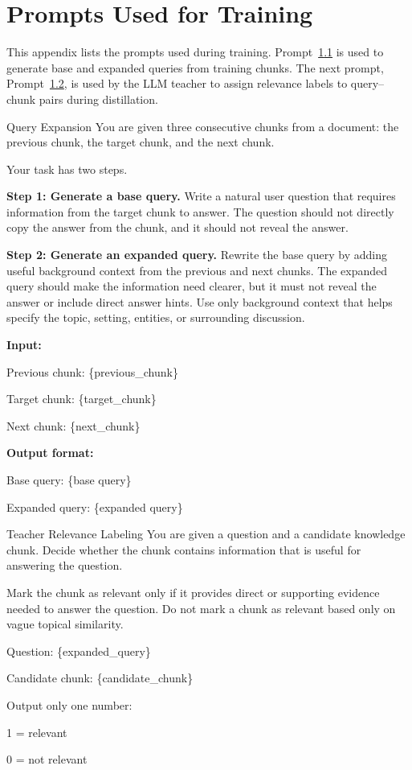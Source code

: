 \section{Prompts Used for Training}
\label{app:training_prompts}

This appendix lists the prompts used during training.  
Prompt~\hyperref[app:training_prompts]{\ref*{app:training_prompts}.1} is used to generate base and expanded queries from training chunks. 
The next prompt, Prompt~\hyperref[app:training_prompts]{\ref*{app:training_prompts}.2}, is used by the LLM teacher to assign relevance labels to query--chunk pairs during distillation.

\begin{promptbox}{Query Expansion}
\label{box:query_generation_prompt}
You are given three consecutive chunks from a document: the previous chunk, the target chunk, and the next chunk.

Your task has two steps.

\textbf{Step 1: Generate a base query.}  
Write a natural user question that requires information from the target chunk to answer. The question should not directly copy the answer from the chunk, and it should not reveal the answer.

\textbf{Step 2: Generate an expanded query.}  
Rewrite the base query by adding useful background context from the previous and next chunks. The expanded query should make the information need clearer, but it must not reveal the answer or include direct answer hints. Use only background context that helps specify the topic, setting, entities, or surrounding discussion.

\textbf{Input:}

Previous chunk: \{previous\_chunk\}

Target chunk: \{target\_chunk\}

Next chunk: \{next\_chunk\}

\textbf{Output format:}

Base query: \{base query\}

Expanded query: \{expanded query\}
\end{promptbox}

\begin{promptbox}{Teacher Relevance Labeling}
\label{box:teacher_labeling_prompt}
You are given a question and a candidate knowledge chunk. Decide whether the chunk contains information that is useful for answering the question.

Mark the chunk as relevant only if it provides direct or supporting evidence needed to answer the question. Do not mark a chunk as relevant based only on vague topical similarity.

Question: \{expanded\_query\}

Candidate chunk: \{candidate\_chunk\}

Output only one number:

1 = relevant

0 = not relevant
\end{promptbox}